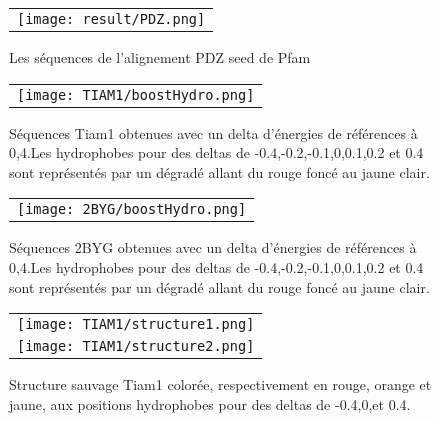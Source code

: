     \clearpage


   \begin{figure}[t]
     \centering
     \begin{tabular}{c}
       \texttt{[image: result/PDZ.png]} \\
     \end{tabular}
     \caption{Les séquences de l'alignement PDZ seed de Pfam}
\label{result:PDZ_seed}
   \end{figure}

    \clearpage

   \begin{figure}[t]
     \centering
     \begin{tabular}{c}
       \texttt{[image: TIAM1/boostHydro.png]} \\
     \end{tabular}
     \caption{Séquences Tiam1 obtenues avec un delta d'énergies de références à 0,4.Les hydrophobes pour des deltas de -0.4,-0.2,-0.1,0,0.1,0.2 et 0.4 sont représentés par un dégradé allant du rouge foncé au jaune clair.}
\label{result:PDZ_seed}
   \end{figure}

    \clearpage

   \begin{figure}[t]
     \centering
     \begin{tabular}{c}
       \texttt{[image: 2BYG/boostHydro.png]} \\
     \end{tabular}
     \caption{Séquences 2BYG obtenues avec un delta d'énergies de références à 0,4.Les hydrophobes pour des deltas de -0.4,-0.2,-0.1,0,0.1,0.2 et 0.4 sont représentés par un dégradé allant du rouge foncé au jaune clair.}
\label{result:PDZ_seed}
   \end{figure}


    \clearpage

   \begin{figure}[t]
     \centering
     \begin{tabular}{c}
       \texttt{[image: TIAM1/structure1.png]} \\
       \texttt{[image: TIAM1/structure2.png]} \\
     \end{tabular}
     \caption{Structure sauvage Tiam1 colorée, respectivement en rouge, orange et jaune, aux positions hydrophobes  pour des deltas de -0.4,0,et 0.4.}
\label{result:PDZ_seed}
   \end{figure}

